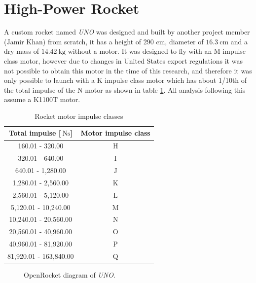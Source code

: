 \documentclass[]{report}
\begin{document}
\section{High-Power Rocket}

A custom rocket named \textit{UNO} was designed and built by another project member (Jamir Khan) from scratch, it has a height of 290 cm, diameter of $\SI{16.3}{\centi\metre}$ and a dry mass of $\SI{14.42}{\kilo\gram}$ without a motor. It was designed to fly with an M impulse class motor, however due to changes in United States export regulations it was not possible to obtain this motor in the time of this research, and therefore it was only possible to launch with a K impulse class motor which has about 1/10th of the total impulse of the N motor as shown in table \ref{tabl:impulseclasses}. All analysis following this assume a K1100T motor.

\begin{table}[H]
  \centering
  \begin{tabular}{|c|c|}
    \hline
    Total impulse [$\SI{}{\newton\second}$] & Motor impulse class \\\hline
    160.01 - 320.00                         & H                   \\
    320.01 - 640.00                         & I                   \\
    640.01 - 1,280.00                       & J                   \\
    1,280.01 - 2,560.00                     & K                   \\
    2,560.01 - 5,120.00                     & L                   \\
    5,120.01 - 10,240.00                    & M                   \\
    10,240.01 - 20,560.00                   & N                   \\
    20,560.01 - 40,960.00                   & O                   \\
    40,960.01 - 81,920.00                   & P                   \\
    81,920.01 - 163,840.00                  & Q                   \\
    \hline
  \end{tabular}
  \caption{Rocket motor impulse classes \cite{nfpa2018}}
  \label{tabl:impulseclasses}
\end{table}

\begin{figure}[H]
  
  \caption{OpenRocket diagram of \textit{UNO}.}
  \label{fig:openrocket}
\end{figure}
\end{document}
